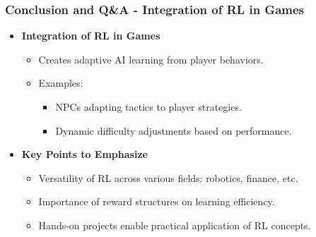 \documentclass[aspectratio=169]{beamer}
\begin{document}
\begin{frame}[fragile]
    \frametitle{Conclusion and Q\&A - Integration of RL in Games}
    \begin{itemize}
        \item \textbf{Integration of RL in Games}
            \begin{itemize}
                \item Creates adaptive AI learning from player behaviors.
                \item Examples:
                    \begin{itemize}
                        \item NPCs adapting tactics to player strategies.
                        \item Dynamic difficulty adjustments based on performance.
                    \end{itemize}
            \end{itemize}
        
        \item \textbf{Key Points to Emphasize}
            \begin{itemize}
                \item Versatility of RL across various fields: robotics, finance, etc.
                \item Importance of reward structures on learning efficiency.
                \item Hands-on projects enable practical application of RL concepts.
            \end{itemize}
    \end{itemize}
\end{frame}
\end{document}

